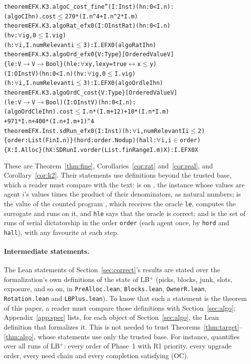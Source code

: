 \documentclass[runningheads,11pt]{llncs}
\newcommand{\LBp}{\texorpdfstring{\mbox{LB$^{+}$}}{LB+}}
\begin{document}
\begin{alltt}\small
theorem EFX.K3.algoC_cost_fine'' (I : Inst) (hn : 0 < I.n) :
    (algoC I hn).cost \(\le\) 270 * (I.n ^ 4 + I.n ^ 2 * I.m)
theorem EFX.K3.algoRat_efx0 (I : OInst Rat) (hn : 0 < I.n)
    (hv : \(\forall\) i g, 0 \(\le\) I.v i g)
    (h : \(\forall\) i, I.numRelevant i \(\le\) 3) : I.EFX0 (algoRat I hn)
theorem EFX.K3.algoOrd_efx0 \{V : Type\} [OrderedValue V]
    \{le : V \(\to\) V \(\to\) Bool\} (hle : \(\forall\) x y, le x y = true \(\leftrightarrow\) x \(\le\) y)
    (I : OInst V) (hn : 0 < I.n) (hv : \(\forall\) i g, 0 \(\le\) I.v i g)
    (h : \(\forall\) i, I.numRelevant i \(\le\) 3) : I.EFX0 (algoOrd le I hn)
theorem EFX.K3.algoOrdC_cost \{V : Type\} [OrderedValue V]
    (le : V \(\to\) V \(\to\) Bool) (I : OInst V) (hn : 0 < I.n) :
    (algoOrdC le I hn).cost \(\le\) I.n * (I.m + 12) + 10 * (I.n * I.m)
      + 971 * I.n + 400 * (I.n + I.m + 1) ^ 4
theorem EFX.Inst.sdRun_efx0 (I : Inst) (h : \(\forall\) i, numRelevant I i \(\le\) 2)
    \{order : List (Fin I.n)\} (hord : order.Nodup) (hall : \(\forall\) i, i \(\in\) order)
    \{X : I.Alloc\} (hX : SDRun I.v order (List.finRange I.m) X) : I.EFX0 X
\end{alltt}
These are Theorem~\ref{thm:fine}, Corollaries~\ref{cor:rat} and~\ref{cor:real}, and Corollary~\ref{cor:k2}. Their statements use definitions beyond the trusted base, which a reader must compare with the text:  is  on , the instance whose values are agent $i$'s values times the product of their denominators, as natural numbers;  is the value of the counted program , which receives the oracle \texttt{le}, computes the surrogate  and runs  on it, and \texttt{hle} says that the oracle is correct; and  is the set of runs of serial dictatorship in the order \texttt{order} (each agent once, by \texttt{hord} and \texttt{hall}), with any favourite at each step.

\paragraph{Intermediate statements.} The Lean statements of Section~\ref{sec:correct}'s results are stated over the formalization's own definitions of the state of \LBp{} (picks, blocks, junk, slots, exposure, and so on, in \texttt{PreAlloc.lean}, \texttt{Blocks.lean}, \texttt{OwnerR.lean}, \texttt{Rotation.lean} and \texttt{LBPlus.lean}). To know that such a statement is the theorem of this paper, a reader must compare those definitions with Section~\ref{sec:algo}; Appendix~\ref{app:spec} lists, for each object of Section~\ref{sec:algo}, the Lean definition that formalizes it. This is not needed to trust Theorems~\ref{thm:target}--\ref{thm:algo}, whose statements use only the trusted base. For instance,  quantifies over all runs of \LBp{}: every order of Phase~1 with R1 priority, every upgrade order, every need chain and every completion satisfying (OC).
\end{document}
